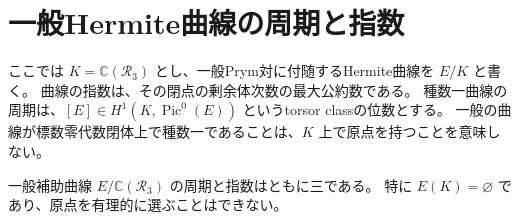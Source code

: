 \section{一般Hermite曲線の周期と指数}
\label{subsec:hermite-index-three-v27}

ここでは $K=\mathbb C(\mathcal R_3)$ とし、一般Prym対に付随するHermite曲線を $E/K$ と書く。
曲線の指数は、その閉点の剰余体次数の最大公約数である。
種数一曲線の周期は、$[E]\in H^1(K,\operatorname{Pic}^0(E))$ というtorsor classの位数とする。
一般の曲線が標数零代数閉体上で種数一であることは、$K$ 上で原点を持つことを意味しない。

\begin{theorem}[補助曲線の指数三]
\label{thm:hermite-index-three-v27}
一般補助曲線 $E/\mathbb C(\mathcal R_3)$ の周期と指数はともに三である。
特に $E(K)=\varnothing$ であり、原点を有理的に選ぶことはできない。
\end{theorem}

